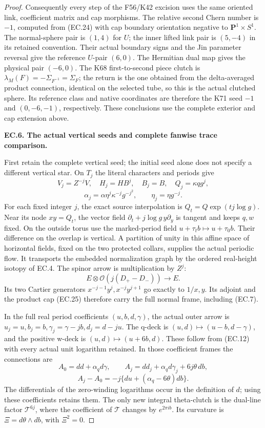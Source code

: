 \begin{proof}
Consequently every step of the F56/K42 excision uses the same
oriented link, coefficient matrix and cap morphisms. The relative
second Chern number is \(-1\), computed from (EC.24) with cap
boundary orientation negative to \(\mathbf P^1\times S^1\).
The normal-sphere pair is \((1,4)\) for \(U\); the inner lifted
link pair is \((5,-4)\) in its retained convention. Their actual
boundary signs and the Jin parameter reversal give the reference
\(U\)-pair \((6,0)\). The Hermitian dual map gives the physical
pair \((-6,0)\). The K68 first-to-second piece clutch is
\(\lambda_M(F)=-\Sigma_{F^{-1}}=\Sigma_F\); the return is the
one obtained from the delta-averaged product connection, identical
on the selected tube, so this is the actual clutched sphere. Its
reference class and native coordinates are therefore the K71 seed
\(-1\) and \((0,-6,-1)\), respectively. These conclusions use the
complete exterior and cap extension above.

\par\medskip\noindent\textbf{EC.6. The actual vertical seeds and complete fanwise trace comparison.}\par\nopagebreak[4]

First retain the complete vertical seed; the initial seed alone does
not specify a different vertical star. On \(T_j\) the literal
characters and periods give
\[
 V_j=Z^{-j}V,\quad H_j=HB^j,\quad B_j=B,\quad
 Q_j=\kappa qg^j,
\]
\[
 \alpha_j=\alpha\eta^j\kappa^{-j}g^{-j^2},
 \qquad\eta_j=\eta g^{-j}.
 \tag{EC.26a}
\]
For each fixed integer \(j\), the exact source interpolation is
\(Q_t=Q\exp(tj\log g)\). Near its node \(xy=Q_t\), the vector
field \(\partial_t+j\log g\,y\partial_y\) is tangent and keeps
\(q,w\) fixed. On the outside torus use the marked-period field
\(u+\tau_t b\mapsto u+\tau_0b\). Their difference on the
overlap is vertical. A partition of unity in this affine space
of horizontal fields, fixed on the two protected collars, supplies
the actual periodic flow. It transports the embedded normalization
graph by the ordered real-height isotopy of EC.4. The spinor arrow
is multiplication by \(Z^j\):
\[
 E\otimes\mathcal O(j(D_+-D_-))\longrightarrow E.
\]
Its two Cartier generators \(x^{-j-1}y^j,x^{-j}y^{j+1}\) go
exactly to \(1/x,y\). Its adjoint and the product cap (EC.25)
therefore carry the full normal frame, including (EC.7).

In the full real period coefficients \((u,b,d,\gamma)\), the
actual outer arrow is
\(u_j=u,b_j=b,\gamma_j=\gamma-jb,d_j=d-ju\).
The q-deck is \((u,d)\mapsto(u-b,d-\gamma)\), and the positive
w-deck is \((u,d)\mapsto(u+6b,d)\). These follow from (EC.12)
with every actual unit logarithm retained. In those coefficient
frames the connections are
\[
 A_0=dd+\alpha_q d\gamma,\qquad
 A_j=dd_j+\alpha_q d\gamma_j+6j\theta\,db,
\]
\[
 A_j-A_0=-j\{du+(\alpha_q-6\theta)db\}.
 \tag{EC.26b}
\]
The differentials of the zero-winding logarithms occur in the
definition of \(d\); using these coefficients retains them.
The only new integral theta-clutch is the dual-line factor
\(\mathcal T^{6j}\), where the coefficient of \(\mathcal T\)
changes by \(e^{2\pi i b}\). Its curvature is
\(\Xi=d\theta\wedge db\), with \(\Xi^2=0\).


\end{proof}
